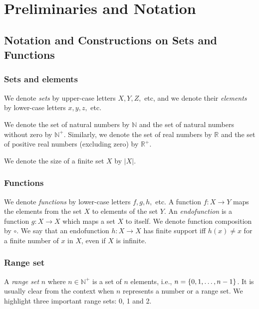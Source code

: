 

\chapter{Preliminaries and Notation} %
\label{ch:Preliminaries} %

\section{Notation and Constructions on Sets and Functions}
\subsection{Sets and elements}
We denote \emph{sets} by upper-case letters $X,Y,Z,$ etc, and we denote their \emph{elements} by lower-case letters $x, y, z, $ etc. 

We denote the set of natural numbers by $\mathbb{N}$ and the set of natural numbers without zero by $\mathbb{N}^+$. Similarly, we denote the set of real numbers by $\mathbb{R}$ and the set of positive real numbers (excluding zero) by $\mathbb{R}^+$.

We denote the size of a finite set $X$ by $|X|$.

\subsection{Functions}
We denote \emph{functions} by lower-case letters $f,g,h,$ etc. A function $f\colon X\rightarrow Y$ maps the elements from the set $X$ to elements of the set $Y$. An \emph{endofunction} is a function $g\colon X\rightarrow X$ which maps a set $X$ to itself. We denote function composition by $\circ$. 
We say that an endofunction $h\colon X \rightarrow X$ has finite support iff $h(x)\neq x$ for a finite number of $x$ in $X$, even if $X$ is infinite.

\subsection{Range set}
A \emph{range set} $n$ where $n\in \mathbb{N}^+$ is a set of $n$ elements, i.e., $n=\left\{0,1, \ldots, n-1\right\}$. It is usually clear from the context when $n$ represents a number or a range set. We highlight three important range sets: 0, 1 and 2.

